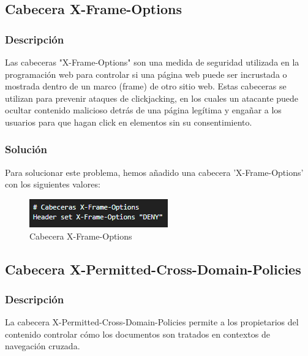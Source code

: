 \documentclass{report}
\begin{document}
            \subsection{Cabecera X-Frame-Options}
                \subsubsection{Descripción}
                    Las cabeceras "X-Frame-Options" son una medida de seguridad utilizada en la programación web para controlar si una página web puede ser incrustada o mostrada dentro de un marco (frame) de otro sitio web. Estas cabeceras se utilizan para prevenir ataques de clickjacking, en los cuales un atacante puede ocultar contenido malicioso detrás de una página legítima y engañar a los usuarios para que hagan click en elementos sin su consentimiento.
                \subsubsection{Solución}
                    Para solucionar este problema, hemos añadido una cabecera 'X-Frame-Options' con los siguientes valores:
                    \begin{figure}[H]
                        \centering
                        \includegraphics[width=\textwidth]{./img/vulnerabilidades/3.5/7.1.png}
                        \caption{Cabecera X-Frame-Options}
                    \end{figure}
            \clearpage
            \subsection{Cabecera X-Permitted-Cross-Domain-Policies}
                \subsubsection{Descripción}
                    La cabecera X-Permitted-Cross-Domain-Policies permite a los propietarios del contenido controlar cómo los documentos son tratados en contextos de navegación cruzada.
\end{document}
